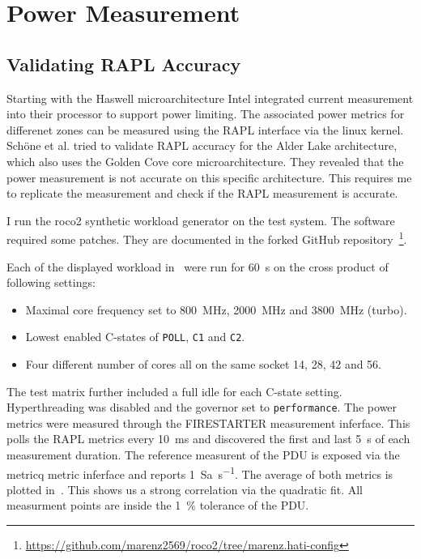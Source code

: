 \chapter{Power Measurement}

\section{Validating RAPL Accuracy}
Starting with the Haswell microarchitecture Intel integrated current measurement into their processor to support power limiting.
The associated power metrics for differenet zones can be measured using the RAPL interface via the linux kernel.
Schöne et al. tried to validate RAPL accuracy for the Alder Lake architecture, which also uses the Golden Cove core microarchitecture.
They revealed that the power measurement is not accurate on this specific architecture.
This requires me to replicate the measurement and check if the RAPL measurement is accurate.

I run the roco2 synthetic workload generator on the test system.
The software required some patches.
They are documented in the forked GitHub repository~\footnote{\url{https://github.com/marenz2569/roco2/tree/marenz.hati-config}}.

Each of the displayed workload in~ were run for \SI{60}{\second} on the cross product of following settings:
\begin{itemize}
    \item Maximal core frequency set to \SI{800}{\MHz}, \SI{2000}{\MHz} and \SI{3800}{\MHz} (turbo).
    \item Lowest enabled C-states of \texttt{POLL}, \texttt{C1} and \texttt{C2}.
    \item Four different number of cores all on the same socket \SI{14}{}, \SI{28}{}, \SI{42}{} and \SI{56}{}.
\end{itemize}
The test matrix further included a full idle for each C-state setting.
Hyperthreading was disabled and the governor set to \texttt{performance}.
The power metrics were measured through the FIRESTARTER measurement inferface.
This polls the RAPL metrics every \SI{10}{\ms} and discovered the first and last \SI{5}{\second} of each measurement duration.
The reference measurent of the PDU is exposed via the metricq metric inferface and reports \SI{1}{Sa\per\second}.
The average of both metrics is plotted in~.
This shows us a strong correlation via the quadratic fit.
All measurment points are inside the \SI{1}{\percent} tolerance of the PDU.

